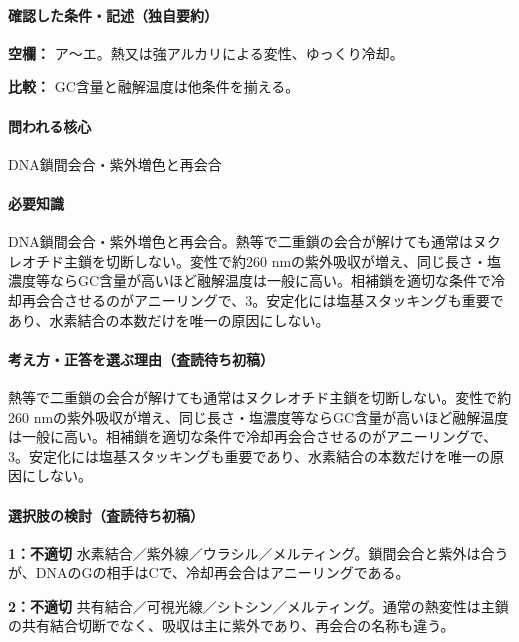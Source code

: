 \paragraph{確認した条件・記述（独自要約）}\mbox{}\par

\noindent\textbf{空欄：} ア〜エ。熱又は強アルカリによる変性、ゆっくり冷却。\par

\noindent\textbf{比較：} GC含量と融解温度は他条件を揃える。\par

\paragraph{問われる核心} DNA鎖間会合・紫外増色と再会合

\paragraph{必要知識} DNA鎖間会合・紫外増色と再会合。熱等で二重鎖の会合が解けても通常はヌクレオチド主鎖を切断しない。変性で約260 nmの紫外吸収が増え、同じ長さ・塩濃度等ならGC含量が高いほど融解温度は一般に高い。相補鎖を適切な条件で冷却再会合させるのがアニーリングで、3。安定化には塩基スタッキングも重要であり、水素結合の本数だけを唯一の原因にしない。

\paragraph{考え方・正答を選ぶ理由（査読待ち初稿）} 熱等で二重鎖の会合が解けても通常はヌクレオチド主鎖を切断しない。変性で約260 nmの紫外吸収が増え、同じ長さ・塩濃度等ならGC含量が高いほど融解温度は一般に高い。相補鎖を適切な条件で冷却再会合させるのがアニーリングで、3。安定化には塩基スタッキングも重要であり、水素結合の本数だけを唯一の原因にしない。

\paragraph{選択肢の検討（査読待ち初稿）}\mbox{}\par

\noindent\textbf{1：不適切} 水素結合／紫外線／ウラシル／メルティング。鎖間会合と紫外は合うが、DNAのGの相手はCで、冷却再会合はアニーリングである。\par

\noindent\textbf{2：不適切} 共有結合／可視光線／シトシン／メルティング。通常の熱変性は主鎖の共有結合切断でなく、吸収は主に紫外であり、再会合の名称も違う。\par

